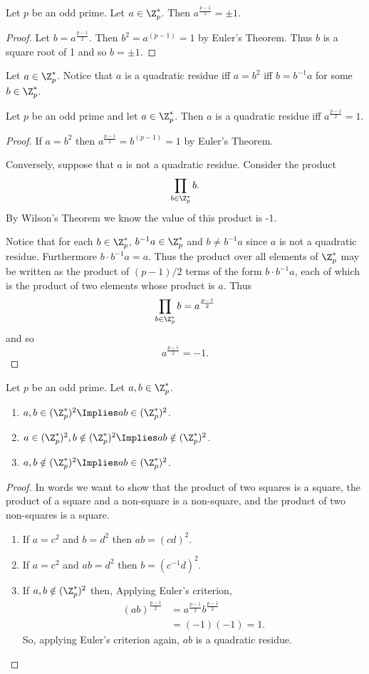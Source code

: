\documentclass[oneside,12pt]{amsart}
\begin{document}
\begin{lemma}
Let $p$ be an odd prime. Let $a\in\Z^*_p$. Then $a^{\frac{p-1}{2}} = \pm 1$.
\end{lemma}
\begin{proof}
Let $b=a^{\frac{p-1}{2}}$. Then $b^2=a^{(p-1)} = 1$ by Euler's Theorem. Thus
$b$ is a square root of 1 and so $b=\pm 1$.
\end{proof}

Let $a\in\Z^*_p$.
Notice that $a$ is a quadratic residue iff $a = b^2$ iff $b=b^{-1}a$ for some $b\in\Z^*_p$.

\begin{theorem}
Let $p$ be an odd prime and let $a\in\Z^*_p$. Then
$a$ is a quadratic residue iff $a^{\frac{p-1}{2}}=1$.
\end{theorem}
\begin{proof}
If $a=b^2$ then $a^{\frac{p-1}{2}} = b^{(p-1)} =1$ by Euler's Theorem. 

Conversely, suppose that $a$ is not a quadratic residue. Consider the product 
$$\prod_{b\in\Z^*_p} b.$$
By Wilson's Theorem we know the value of this product is -1. 

Notice that for each $b\in\Z^*_p$, $b^{-1} a\in\Z^*_p$ and
$b\not=b^{-1} a$ since $a$ is not a quadratic residue. Furthermore $b\cdot b^{-1}a = a$.
Thus the product over all elements of $\Z^*_p$ may be written as the product of $(p-1)/2$ terms
of the form $b\cdot b^{-1}a$, each of which is the product of two elements whose product is $a$. Thus
$$\prod_{b\in\Z^*_p} b = a^{\frac{p-1}{2}}$$ and so
$$a^{\frac{p-1}{2}} = -1.$$
\end{proof}

\begin{theorem}
Let $p$ be an odd prime. Let $a,b\in\Z^*_p$.
\begin{enumerate}
\item $a,b\in(\Z^*_p)^2 \Implies ab \in (\Z^*_p)^2$.
\item $a\in(\Z^*_p)^2, b\notin(\Z^*_p)^2 \Implies ab \notin (\Z^*_p)^2$.
\item $a,b\notin(\Z^*_p)^2 \Implies ab \in (\Z^*_p)^2$.
\end{enumerate}
\end{theorem}
\begin{proof}
In words we want to show that the product of two squares is a square, the
product of a square and a non-square is a non-square, and the product of two non-squares is a square.
\begin{enumerate}
\item If $a=c^2$ and $b=d^2$ then $ab = (cd)^2$.
\item If $a=c^2$ and $ab=d^2$ then $b=(c^{-1}d)^2$.
\item If $a,b\notin(\Z^*_p)^2$ then, Applying Euler's criterion,
\begin{align*}
(ab)^{\frac{p-1}{2}} &= a^{\frac{p-1}{2}}b^{\frac{p-1}{2}}\\
                     &= (-1)(-1) =1.
\end{align*}
So, applying Euler's criterion again, $ab$ is a quadratic residue.
\end{enumerate}
\end{proof}
\end{document}
